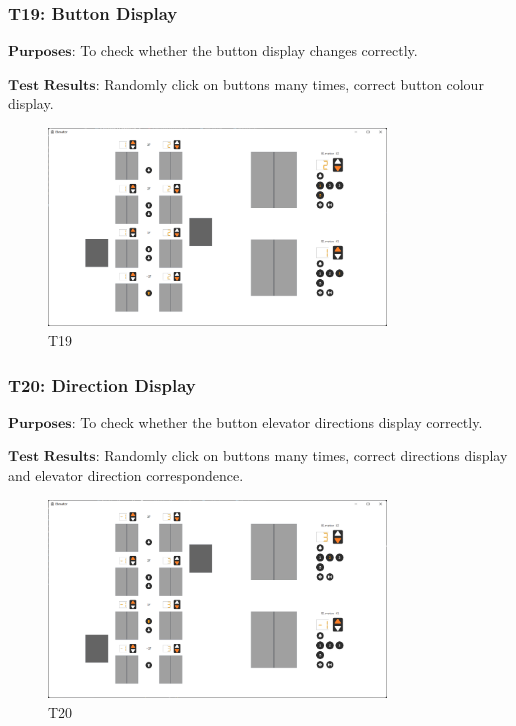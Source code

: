 \documentclass{article}
\begin{document}
\subsubsection*{T19: Button Display}
$\textbf{Purposes:}$ To check whether the button display changes correctly.

$\textbf{Test Results:}$ Randomly click on buttons many times, correct button colour display.

\begin{figure}[htbp]
    \centering
    \includegraphics[width=0.8\textwidth]{img/T19.png}
    \caption{T19}
\end{figure}

\subsubsection*{T20: Direction Display}
$\textbf{Purposes:}$ To check whether the button elevator directions display correctly.

$\textbf{Test Results:}$ Randomly click on buttons many times, correct directions display and elevator direction correspondence.

\begin{figure}[htbp]
    \centering
    \includegraphics[width=0.8\textwidth]{img/T20.png}
    \caption{T20}
\end{figure}
\end{document}
